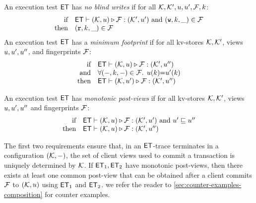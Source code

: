 \begin{definition}[$\ET$ properties]
\label{def:et_properties}
An execution test $\ET$ has \emph{no blind writes} if
for all $\mathcal{K}, \mathcal{K}', u, u', \mathcal{F}, k$:\\
\[
\begin{array}{@{} r @{\hspace{10pt}} l @{}}
\text{if} & \ET \vdash (\hh, \vi) \triangleright \opset: (\hh',\vi' ) 
\text{ and } (\otW, \ke, \_) \in \opset \\
\text{then} & (\otR, \ke, \_) \in \opset
\end{array} 
\]
An execution test $\ET$ has a \emph{minimum footprint} if for all kv-stores $\mathcal{K}, \mathcal{K}'$,
views $u, u',u''$, and fingerprints $\mathcal{F}$: 
%
\[
\begin{array}{@{} r @{\hspace{10pt}} l @{}}
    \text{if} & \ET \vdash (\hh, \vi) \triangleright \opset : (\hh', \vi'')  \\
    \text{and} & \fora{(\stub, \ke, \stub) \in \f} \vi(\ke) {=} \vi'(\ke) \\
    \text{then} & \ET \vdash (\hh, \vi') \triangleright \opset : (\hh', \vi'')
\end{array} 
\]
%

An execution test $\ET$ has \emph{monotonic post-views} if 
for all kv-stores $\mathcal{K},\mathcal{K}'$, 
views $u, u',u''$ and fingerprints $\mathcal{F}$:
\[
\begin{array}{@{} r @{\hspace{10pt}} l @{}}
    \text{if} & \ET \vdash (\hh, \vi) \triangleright \opset : (\hh',\vi' )
    \text{ and } \vi' \sqsubseteq \vi''  \\
    \text{then} & \ET \vdash (\hh, \vi) \triangleright \opset : (\hh',\vi'')
\end{array} 
\]
\end{definition}
The first two requirements ensure that, in an $\ET$-trace 
terminates in a configuration $(\mathcal{K}, -)$, 
the set of client views used to commit a transaction is uniquely determined by $\mathcal{K}$. 
If $\mathsf{ET}_1, \mathsf{ET}_2$ have monotonic post-views, then there exists at least one common post-view 
that can be obtained after a client commits $\mathcal{F}$ to $(\mathcal{K}, u)$ using $\mathsf{ET}_1$ and $\mathsf{ET}_2$. 
we refer the reader to \cref{sec:counter-examples-composition} for counter examples.

